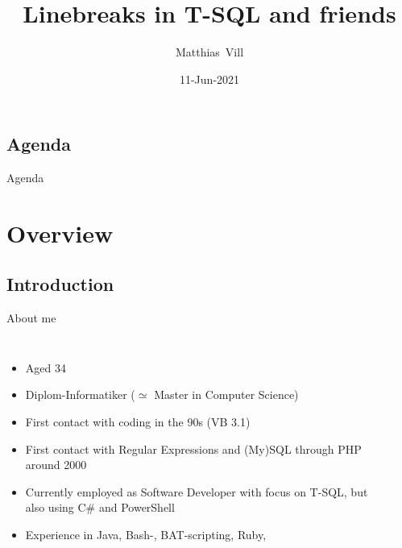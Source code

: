 \documentclass[english,aspectratio=169,handout]{beamer}
\title[Linebreaks in T-SQL and friends]{Linebreaks in T-SQL and friends}
\author[M. Vill]{Matthias~Vill}
\institute[DM 2021]{Data Minutes 2021}
\date{11-Jun-2021}
\begin{document}
\frame{\maketitle}


\subsection*{Agenda}
\begin{frame}{Agenda}
    \tableofcontents%
\end{frame}

\section{Overview}

\subsection{Introduction}
\begin{frame}{About me}
\begin{columns}
        \begin{itemize}
            \item Aged 34
            \item Diplom-Informatiker ($\simeq$ Master in Computer Science)
            \item First contact with coding in the 90s (VB 3.1)
            \item First contact with Regular Expressions and (My)SQL through PHP around 2000
            \item Currently employed as Software Developer with focus on T-SQL, but also using C\# and PowerShell
            \item Experience in Java, Bash-, BAT-scripting, Ruby, \textellipsis
        \end{itemize}
        \begin{center}
            \hyperlink{https://www.youracclaim.com/badges/bd81bbb0-8416-40b7-bede-77e7f2b0d5cf}{ }
        \end{center}
        \begin{center}
        \end{center}
    \end{columns}
\end{frame}
\end{document}
